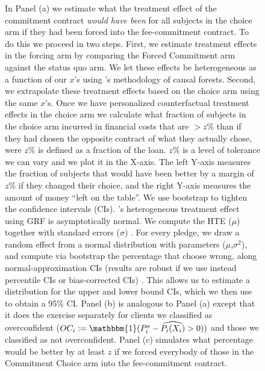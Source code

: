 \documentclass[oneside,11pt]{article}
\begin{document}
{\begin{figure}[H]
\begin{center}
    \end{center}
        \scriptsize
        In Panel (a) we estimate what the treatment effect of the commitment contract \textit{would have been} for all subjects in the choice arm if they had been forced into the fee-commitment contract. To do this we proceed in two steps. First, we estimate treatment effects in the forcing arm by comparing the Forced Commitment arm against the status quo arm. We let these effects be heterogeneous as a function of our $x$'s using \cite{atheygrf}'s methodology of causal forests. Second, we extrapolate these treatment effects based on the choice arm using the same $x$'s. Once we have personalized counterfactual treatment effects in the choice arm we calculate what fraction of subjects in the choice arm incurred in financial costs that are  $> z$\% than if they had chosen the opposite contract of what they actually chose, were $z$\% is defined as a fraction of the loan. $z$\% is a level of tolerance we can vary and we plot it in the X-axis. The left Y-axis measures the fraction of subjects that would have been better by a margin of $z$\% if they changed their choice, and the right Y-axis measures the amount of money ``left on the table''. We use bootstrap to tighten the confidence intervals (CIs). \cite{atheygrf}'s heterogeneous treatment effect using GRF is asymptotically normal. We compute the HTE ($\mu$) together with standard errors ($\sigma$) . For every pledge, we draw a random effect from a normal distribution with parameters ($\mu$,$\sigma^2$), and compute via bootstrap the percentage that choose wrong, along normal-approximation CIs (results are robust if we use instead percentile CIs or bias-corrected CIs) . This allows us to estimate a distribution for the upper and lower bound CIs, which we then use to obtain a 95\% CI. Panel (b) is analogous to Panel (a) except that it does the exercise separately for clients we classified as overconfident ($OC_i:=\mathbbm{1}(P^s_i-\widehat{P_i(X_i)}>0))$ and those we classified as not overconfident. Panel (c) simulates what percentage would be better by at least $z$ if we forced everybody of those in the Commitment Choice arm into the fee-commitment contract.

\end{figure}}
\end{document}
